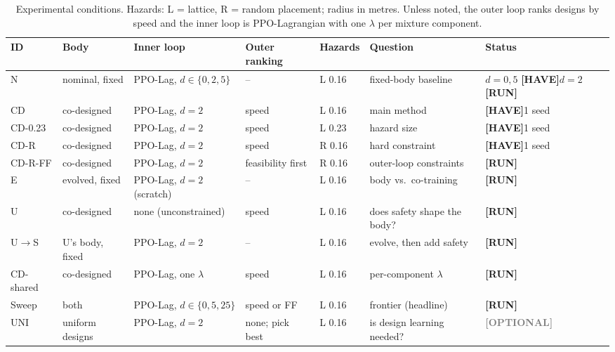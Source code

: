 \documentclass[sigconf,review]{acmart}
\newcommand{\statustag}[2]{\textcolor{#1}{\textsf{\scriptsize\bfseries[#2]}}}
\newcommand{\HAVE}{\statustag{teal!70!black}{HAVE}\hspace{0.3em}}
\newcommand{\RUN}{\statustag{red!75!black}{RUN}\hspace{0.3em}}
\newcommand{\OPT}{\statustag{gray}{OPTIONAL}\hspace{0.3em}}
\begin{document}
\begin{table}[t]
\caption{Experimental conditions. Hazards: L = lattice, R = random placement; radius in metres. Unless noted, the outer loop ranks designs by speed and the inner loop is PPO-Lagrangian with one $\lambda$ per mixture component.}
\label{tab:conditions}
\footnotesize
\setlength{\tabcolsep}{4pt}
\begin{tabular}{lllllll}
\toprule
ID & Body & Inner loop & Outer ranking & Hazards & Question & Status \\
\midrule
N & nominal, fixed & PPO-Lag, $d \in \{0, 2, 5\}$ & -- & L 0.16 & fixed-body baseline & $d=0,5$ \HAVE $d=2$ \RUN \\
CD & co-designed & PPO-Lag, $d=2$ & speed & L 0.16 & main method & \HAVE 1 seed \\
CD-0.23 & co-designed & PPO-Lag, $d=2$ & speed & L 0.23 & hazard size & \HAVE 1 seed \\
CD-R & co-designed & PPO-Lag, $d=2$ & speed & R 0.16 & hard constraint & \HAVE 1 seed \\
CD-R-FF & co-designed & PPO-Lag, $d=2$ & feasibility first & R 0.16 & outer-loop constraints & \RUN \\
E & evolved, fixed & PPO-Lag, $d=2$ (scratch) & -- & L 0.16 & body vs.\ co-training & \RUN \\
U & co-designed & none (unconstrained) & speed & L 0.16 & does safety shape the body? & \RUN \\
U$\to$S & U's body, fixed & PPO-Lag, $d=2$ & -- & L 0.16 & evolve, then add safety & \RUN \\
CD-shared & co-designed & PPO-Lag, one $\lambda$ & speed & L 0.16 & per-component $\lambda$ & \RUN \\
Sweep & both & PPO-Lag, $d \in \{0, 5, 25\}$ & speed or FF & L 0.16 & frontier (headline) & \RUN \\
UNI & uniform designs & PPO-Lag, $d=2$ & none; pick best & L 0.16 & is design learning needed? & \OPT \\
\bottomrule
\end{tabular}
\end{table}
\end{document}
